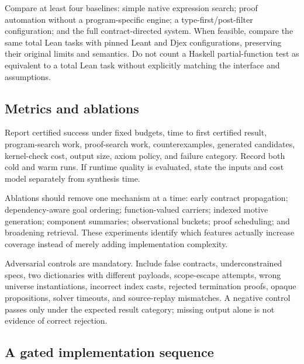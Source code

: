\documentclass[11pt,letterpaper]{article}
\theoremstyle{definition}
\theoremstyle{remark}
\begin{document}
Compare at least four baselines: simple native expression search; proof automation without a program-specific engine; a type-first/post-filter configuration; and the full contract-directed system. When feasible, compare the same total Lean tasks with pinned Leant and Djex configurations, preserving their original limits and semantics. Do not count a Haskell partial-function test as equivalent to a total Lean task without explicitly matching the interface and assumptions.

\subsection{Metrics and ablations}

Report certified success under fixed budgets, time to first certified result, program-search work, proof-search work, counterexamples, generated candidates, kernel-check cost, output size, axiom policy, and failure category. Record both cold and warm runs. If runtime quality is evaluated, state the inputs and cost model separately from synthesis time.

Ablations should remove one mechanism at a time: early contract propagation; dependency-aware goal ordering; function-valued carriers; indexed motive generation; component summaries; observational buckets; proof scheduling; and broadening retrieval. These experiments identify which features actually increase coverage instead of merely adding implementation complexity.

Adversarial controls are mandatory. Include false contracts, underconstrained specs, two dictionaries with different payloads, scope-escape attempts, wrong universe instantiations, incorrect index casts, rejected termination proofs, opaque propositions, solver timeouts, and source-replay mismatches. A negative control passes only under the expected result category; missing output alone is not evidence of correct rejection.

\subsection{A gated implementation sequence}
\end{document}

